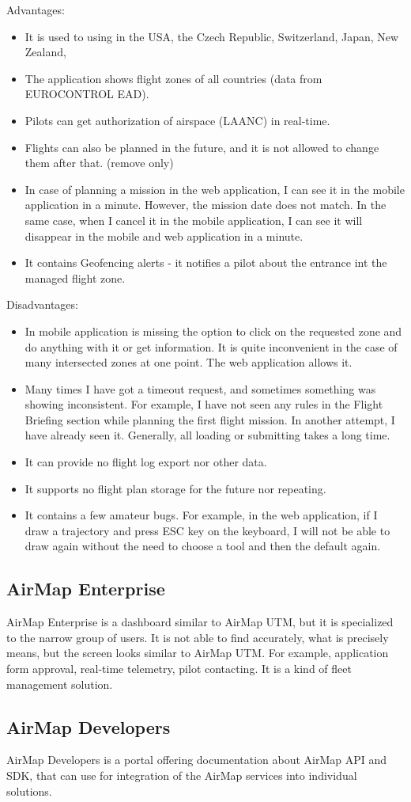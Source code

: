 Advantages:
\begin{itemize}
    \item It is used to using in the USA, the Czech Republic, Switzerland, Japan, New Zealand, \textellipsis
    \item The application shows flight zones of all countries (data from EUROCONTROL EAD).\cite{eurocontrol}
    \item Pilots can get authorization of airspace (LAANC) in real-time.
    \item Flights can also be planned in the future, and it is not allowed to change them after that. (remove only)
    \item In case of planning a mission in the web application, I can see it in the mobile application in a minute.
    However, the mission date does not match.
    In the same case, when I cancel it in the mobile application, I can see it will disappear in the mobile and web application in a minute.
    \item It contains Geofencing alerts - it notifies a pilot about the entrance int the managed flight zone.
\end{itemize}
Disadvantages:
\begin{itemize}
    \item In mobile application is missing the option to click on the requested zone and do anything with it or get information.
    It is quite inconvenient in the case of many intersected zones at one point.
    The web application allows it.
    \item Many times I have got a timeout request, and sometimes something was showing inconsistent.
    For example, I have not seen any rules in the Flight Briefing section while planning the first flight mission.
    In another attempt, I have already seen it.
    Generally, all loading or submitting takes a long time.
    \item It can provide no flight log export nor other data.
    \item It supports no flight plan storage for the future nor repeating.
    \item It contains a few amateur bugs.
    For example, in the web application, if I draw a trajectory and press ESC key on the keyboard, I will not be able to draw again without the need to choose a tool and then the default again.
\end{itemize}


\subsection{AirMap Enterprise}\label{subsec:airmap-enterprise}
AirMap Enterprise is a dashboard similar to AirMap UTM, but it is specialized to the narrow group of users.
It is not able to find accurately, what is precisely means, but the screen looks similar to AirMap UTM.
For example, application form approval, real-time telemetry, pilot contacting.
It is a kind of fleet management solution.


\subsection{AirMap Developers}\label{subsec:airmap-developers}
AirMap Developers is a portal offering documentation about AirMap API and SDK, that can use for integration of the AirMap services into individual solutions.\cite{airMapDevelopers}
